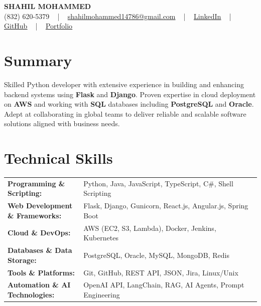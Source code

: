 \documentclass[letterpaper,11pt]{article}
\begin{document}
\begin{center}
    {\fontsize{14pt}{12pt}\selectfont \textbf{\MakeUppercase{Shahil Mohammed}}}\\ \vspace{2pt}
    \fontsize{10pt}{12pt}\selectfont (832) 620-5379 ~ | ~ \href{mailto:shahilmohammed14786@gmail.com}{shahilmohammed14786@gmail.com} ~ | ~  
    \href{https://www.linkedin.com/in/shahil-mohammed-9652931a1/}{\color{blue}\underline{LinkedIn}}  ~ | ~ 
    \href{https://github.com/freakbeast14}{\color{blue}\underline{GitHub}} ~ | ~ 
    \href{https://shahil-mohammed.netlify.app/}{\color{blue}\underline{Portfolio}}
    \vspace{-8pt}
\end{center}

\section{Summary}
\fontsize{9pt}{10pt}\selectfont
Skilled Python developer with extensive experience in building and enhancing backend systems using \textbf{Flask} and \textbf{Django}. Proven expertise in cloud deployment on \textbf{AWS} and working with \textbf{SQL} databases including \textbf{PostgreSQL} and \textbf{Oracle}. Adept at collaborating in global teams to deliver reliable and scalable software solutions aligned with business needs.
 \vspace{-5pt}
 
\section{Technical Skills}
        \vspace{-14pt}
        \begin{table}[h]
            \fontsize{9pt}{10pt}\selectfont
            \begin{tabular}{p{0.3\linewidth} p{0.7\linewidth}}
                \textbf{Programming \& Scripting:} & Python, Java, JavaScript, TypeScript, C\#, Shell Scripting \\
                \textbf{Web Development \& Frameworks:} & Flask, Django, Gunicorn, React.js, Angular.js, Spring Boot \\
                \textbf{Cloud \& DevOps:} & AWS (EC2, S3, Lambda), Docker, Jenkins, Kubernetes \\
                \textbf{Databases \& Data Storage:} & PostgreSQL, Oracle, MySQL, MongoDB, Redis \\
                \textbf{Tools \& Platforms:} & Git, GitHub, REST API, JSON, Jira, Linux/Unix \\
                \textbf{Automation \& AI Technologies:} & OpenAI API, LangChain, RAG, AI Agents, Prompt Engineering \\
            \end{tabular}
        \end{table}
 \vspace{-15pt}
 
\end{document}
